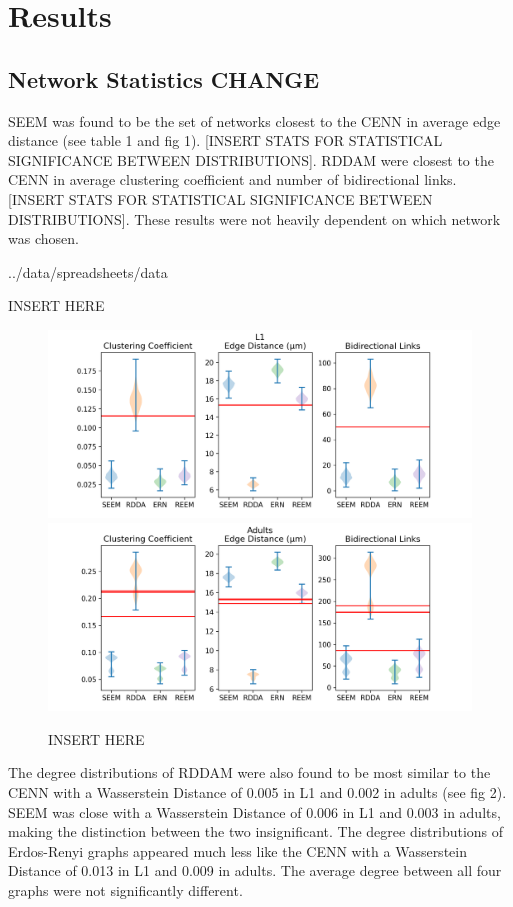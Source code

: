 \section{Results}
\subsection{Network Statistics CHANGE}
SEEM was found to be the set of networks closest to the CENN in average edge distance (see table 1 and fig 1). [INSERT STATS FOR STATISTICAL SIGNIFICANCE BETWEEN DISTRIBUTIONS]. RDDAM were closest to the CENN in average clustering coefficient and number of bidirectional links. [INSERT STATS FOR STATISTICAL SIGNIFICANCE BETWEEN DISTRIBUTIONS]. These results were not heavily dependent on which network was chosen.

\begin{table}[h]
  {../data/spreadsheets/data}
  \caption{INSERT HERE}
\end{table}

\begin{figure}[h]
  \includegraphics[width=\linewidth]{../data/images/stats/L1.png}
  \includegraphics[width=\linewidth]{../data/images/stats/Adults.png}
  \caption{INSERT HERE}
\end{figure}

The degree distributions of RDDAM were also found to be most similar to the CENN with a Wasserstein Distance of 0.005 in L1 and 0.002 in adults (see fig 2). SEEM was close with a Wasserstein Distance of 0.006 in L1 and 0.003 in adults, making the distinction between the two insignificant. The degree distributions of Erdos-Renyi graphs appeared much less like the CENN with a Wasserstein Distance of 0.013 in L1 and 0.009 in adults. The average degree between all four graphs were not significantly different.

